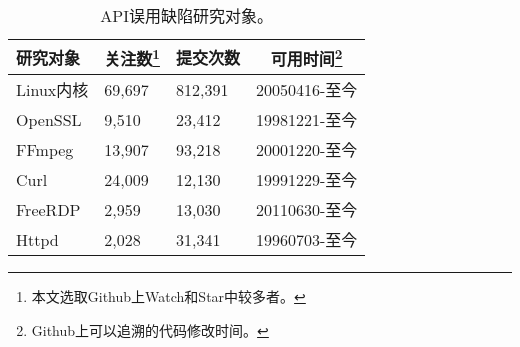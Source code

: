 \begin{table}[t]
	\centering
	\begin{minipage}[t]{0.9\linewidth} %
		\caption{API误用缺陷研究对象。}
		\label{tab:2-3-target}
		\begin{tabular}{lp{3cm}<{\centering}p{3cm}<{\centering}p{4cm}<{\centering}}
			\hline
			{\heiti 研究对象} & 
			\multicolumn{1}{c}{\heiti 关注数\footnote{本文选取Github上Watch和Star中较多者。}} &
			\multicolumn{1}{c}{\heiti 提交次数} & 
			\multicolumn{1}{c}{\heiti 可用时间\footnote{Github上可以追溯的代码修改时间。}} \\
			\hline
			Linux内核   & 69,697 & 812,391 & 20050416-至今\\
			OpenSSL   & 9,510 & 23,412 & 19981221-至今\\
			FFmpeg   & 13,907 & 93,218 & 20001220-至今\\
			Curl   & 24,009 & 12,130 & 19991229-至今\\
			FreeRDP   & 2,959 & 13,030 & 20110630-至今\\
			Httpd   & 2,028 & 31,341 & 19960703-至今\\
			\hline
		\end{tabular}
	\end{minipage}
\end{table}
